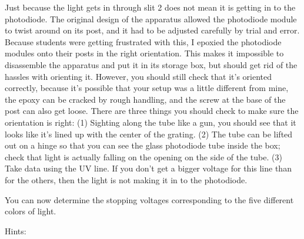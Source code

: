 Just because the light gets in through slit 2 does not mean
it is getting in to the photodiode. The original design of
the apparatus allowed the photodiode module to twist around
on its post, and it had to be adjusted carefully by trial and
error. Because students were getting frustrated with this, I
epoxied the photodiode modules onto their posts in the right
orientation. This makes it impossible to disassemble the
apparatus and put it in its storage box, but should get rid
of the hassles with orienting it. However, you should still
check that it's oriented correctly, because it's possible
that your setup was a little different from mine,
the epoxy can be cracked by rough handling, and the screw
at the base of the post can also get loose. There
are three things you should check to make sure the orientation
is right: (1) Sighting along the tube like a gun, you should
see that it looks like it's lined up with the center of the
grating. (2) The tube can be lifted out on a hinge so that
you can see the glass photodiode tube inside the box; check that light
is actually falling on the opening on the side of the tube.
(3) Take data using the UV line. If
you don't get a bigger voltage for this line than for the
others, then the light is not making it in to the photodiode.

\observations

You can now determine the stopping voltages corresponding to
the five different colors of light.

Hints:

